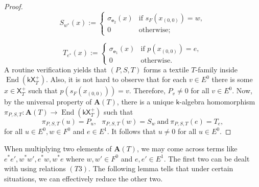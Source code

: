 \documentclass[a4paper,reqno,12pt]{amsart}
\theoremstyle{definition}
\theoremstyle{remark}
\newcommand{\End}{\operatorname{End}}
\begin{document}
\begin{proof}
$$S_{w^*}(x):=
	\left\{
	\begin{array}{ll}
		\sigma_{\mathbf{e}_2}(x)  & \mbox{if } s_F(x_{(0,0)})=w, \\
		0 & \mbox{otherwise};
	\end{array}
	\right.$$

$$T_{e^*}(x):=
	\left\{
	\begin{array}{ll}
		\sigma_{\mathbf{e}_1}(x)  & \mbox{if } p(x_{(0,0)})=e, \\
		0 & \mbox{otherwise}.
	\end{array}
	\right.$$
A routine verification yields that $(P,S,T)$ forms a textile $T$-family inside $\End(\mathsf{k}\mathsf{X}_T^+)$. Also, it is not hard to observe that for each $v\in E^0$ there is some $x\in \mathsf{X}_T^+$ such that $p(s_F(x_{(0,0)}))=v$. Therefore, $P_v\neq 0$ for all $v\in E^0$. Now, by the universal property of $\mathbf{A}(T)$, there is a unique $\mathsf{k}$-algebra homomorphism $\pi_{P,S,T}:\mathbf{A}(T)\longrightarrow \End(\mathsf{k}\mathsf{X}_T^+)$ such that \[\pi_{P,S,T}(u)=P_u,~~~\pi_{P,S,T}(w)=S_w~\text{and}~\pi_{P,S,T}(e)=T_e,\] for all $u\in E^0,w\in F^0$ and $e\in E^1$. It follows that $u\neq 0$ for all $u\in E^0$. 
\end{proof}

When multiplying two elements of $\mathbf{A}(T)$, we may come across terms like $e^*e',w^*w',e^*w, w^*e$ where $w,w'\in F^0$ and $e,e'\in E^1$. The first two can be dealt with using relations $(T3)$. The following lemma tells that under certain situations, we can effectively reduce the other two.
\end{document}
